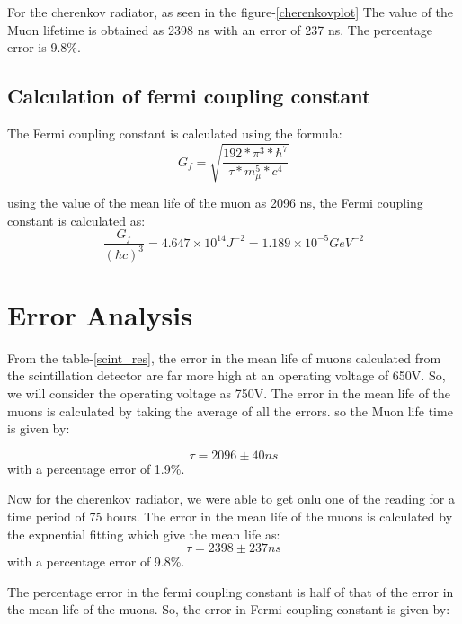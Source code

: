 \documentclass{article}
\begin{document}
\begin{multicols}{2}
For the cherenkov radiator, as seen in the figure-\ref{cherenkovplot}
The value of the Muon lifetime is obtained as 2398 ns with an error of 237 ns. The percentage error is 9.8\%.


\subsection{Calculation of fermi coupling constant}

The Fermi coupling constant is calculated using the formula:
\begin{equation}
    G_f = \sqrt{\frac{192*\pi^3*\hbar^7}{\tau*m_{\mu}^5*c^4}}
\end{equation}

using the value of the mean life of the muon as 2096 ns, the Fermi coupling constant is calculated as:
\begin{equation}
    \frac{G_f}{(\hbar c)^3} = 4.647 \times 10^{14} J^{-2} = 1.189 \times 10^{-5} GeV^{-2} 
\end{equation}


\section{\label{error}Error Analysis}

From the table-\ref{scint_res}, the error in the mean life of muons calculated from the scintillation detector are far more high at an operating voltage of 650V. So, we will consider the operating voltage as 750V. The error in the mean life of the muons is calculated by taking the average of all the errors.
so the Muon life time is given by:

\begin{equation}
    \tau = 2096 \pm 40 ns
\end{equation}
with a percentage error of 1.9\%.


Now for the cherenkov radiator, we were able to get onlu one of the reading for a time period of 75 hours. The error in the mean life of the muons is calculated by the expnential fitting which give the mean life as:
\begin{equation}
    \tau = 2398 \pm 237 ns
\end{equation}
with a percentage error of 9.8\%.


The percentage error in the fermi coupling constant is half of that of the error in the mean life of the muons. So, the error in Fermi coupling constant is given by:


\end{multicols}
\end{document}

